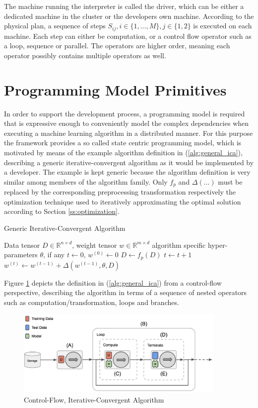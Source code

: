 The machine running the interpreter is called the driver, which can be either a dedicated machine in the cluster or the developers own machine.
According to the physical plan, a sequence of steps $S_{ij}, i \in \{1, \ldots, M\}, j \in \{1, 2\}$ is executed on each machine.
Each step can either be computation, or a control flow operator such as a loop, sequence or parallel.
The operators are higher order, meaning each operator possibly contains multiple operators as well.


\section{Programming Model Primitives}
In order to support the development process, a programming model is required that is expressive enough to conveniently model the complex dependencies when executing a machine learning algorithm in a distributed manner.
For this purpose the framework provides a so called state centric programming model, which is motivated by means of the example algorithm definition in (\ref{alg:general_ica}), describing a generic iterative-convergent algorithm as it would be implemented by a developer.
The example is kept generic because the algorithm definition is very similar among members of the algorithm family.
Only $f_p$ and $\Delta(\ldots)$ must be replaced by the corresponding preprocessing transformation respectively the optimization technique used to iteratively approximating the optimal solution according to Section \ref{ss:optimization}.
\begin{algorithm}
\caption{Generic Iterative-Convergent Algorithm}\label{alg:general_ica}
\begin{algorithmic}[1]{}
\ALGSTATE Data tensor $D \in \mathbb{R}^{n \times d}$, weight tensor $w \in \mathbb{R}^{m \times d}$
\INPUT algorithm specific hyper-parameters $\theta$, if any
\INIT $t \gets 0$, $w^{(0)} \gets 0$
\State $D \gets f_{p}(D)$ 
\Repeat {}
\State $t \gets t + 1$
\State $w^{(t)} \gets w^{(t-1)} + \Delta(w^{(t-1)}, \theta, D)$ 
 
\end{algorithmic}
\end{algorithm}
Figure \ref{fig:ica_control_flow} depicts the definition in (\ref{alg:general_ica}) from a control-flow perspective, describing the algorithm in terms of a sequence of nested operators such as computation/transformation, loops and branches.
\begin{figure}[ht]
\centering
\includegraphics[width=0.9\textwidth]{img/ica_control_flow.png}
\caption{Control-Flow, Iterative-Convergent Algorithm}
\label{fig:ica_control_flow}
\end{figure}
